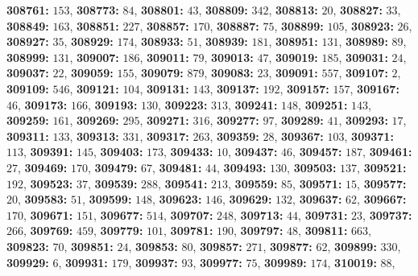 \textsf{\bfseries 308761:} $153$, \textsf{\bfseries 308773:} $84$, \textsf{\bfseries 308801:} $43$, \textsf{\bfseries 308809:} $342$, \textsf{\bfseries 308813:} $20$, \textsf{\bfseries 308827:} $33$, \textsf{\bfseries 308849:} $163$, \textsf{\bfseries 308851:} $227$, \textsf{\bfseries 308857:} $170$, \textsf{\bfseries 308887:} $75$, \textsf{\bfseries 308899:} $105$, \textsf{\bfseries 308923:} $26$, \textsf{\bfseries 308927:} $35$, \textsf{\bfseries 308929:} $174$, \textsf{\bfseries 308933:} $51$, \textsf{\bfseries 308939:} $181$, \textsf{\bfseries 308951:} $131$, \textsf{\bfseries 308989:} $89$, \textsf{\bfseries 308999:} $131$, \textsf{\bfseries 309007:} $186$, \textsf{\bfseries 309011:} $79$, \textsf{\bfseries 309013:} $47$, \textsf{\bfseries 309019:} $185$, \textsf{\bfseries 309031:} $24$, \textsf{\bfseries 309037:} $22$, \textsf{\bfseries 309059:} $155$, \textsf{\bfseries 309079:} $879$, \textsf{\bfseries 309083:} $23$, \textsf{\bfseries 309091:} $557$, \textsf{\bfseries 309107:} $2$, \textsf{\bfseries 309109:} $546$, \textsf{\bfseries 309121:} $104$, \textsf{\bfseries 309131:} $143$, \textsf{\bfseries 309137:} $192$, \textsf{\bfseries 309157:} $157$, \textsf{\bfseries 309167:} $46$, \textsf{\bfseries 309173:} $166$, \textsf{\bfseries 309193:} $130$, \textsf{\bfseries 309223:} $313$, \textsf{\bfseries 309241:} $148$, \textsf{\bfseries 309251:} $143$, \textsf{\bfseries 309259:} $161$, \textsf{\bfseries 309269:} $295$, \textsf{\bfseries 309271:} $316$, \textsf{\bfseries 309277:} $97$, \textsf{\bfseries 309289:} $41$, \textsf{\bfseries 309293:} $17$, \textsf{\bfseries 309311:} $133$, \textsf{\bfseries 309313:} $331$, \textsf{\bfseries 309317:} $263$, \textsf{\bfseries 309359:} $28$, \textsf{\bfseries 309367:} $103$, \textsf{\bfseries 309371:} $113$, \textsf{\bfseries 309391:} $145$, \textsf{\bfseries 309403:} $173$, \textsf{\bfseries 309433:} $10$, \textsf{\bfseries 309437:} $46$, \textsf{\bfseries 309457:} $187$, \textsf{\bfseries 309461:} $27$, \textsf{\bfseries 309469:} $170$, \textsf{\bfseries 309479:} $67$, \textsf{\bfseries 309481:} $44$, \textsf{\bfseries 309493:} $130$, \textsf{\bfseries 309503:} $137$, \textsf{\bfseries 309521:} $192$, \textsf{\bfseries 309523:} $37$, \textsf{\bfseries 309539:} $288$, \textsf{\bfseries 309541:} $213$, \textsf{\bfseries 309559:} $85$, \textsf{\bfseries 309571:} $15$, \textsf{\bfseries 309577:} $20$, \textsf{\bfseries 309583:} $51$, \textsf{\bfseries 309599:} $148$, \textsf{\bfseries 309623:} $146$, \textsf{\bfseries 309629:} $132$, \textsf{\bfseries 309637:} $62$, \textsf{\bfseries 309667:} $170$, \textsf{\bfseries 309671:} $151$, \textsf{\bfseries 309677:} $514$, \textsf{\bfseries 309707:} $248$, \textsf{\bfseries 309713:} $44$, \textsf{\bfseries 309731:} $23$, \textsf{\bfseries 309737:} $266$, \textsf{\bfseries 309769:} $459$, \textsf{\bfseries 309779:} $101$, \textsf{\bfseries 309781:} $190$, \textsf{\bfseries 309797:} $48$, \textsf{\bfseries 309811:} $663$, \textsf{\bfseries 309823:} $70$, \textsf{\bfseries 309851:} $24$, \textsf{\bfseries 309853:} $80$, \textsf{\bfseries 309857:} $271$, \textsf{\bfseries 309877:} $62$, \textsf{\bfseries 309899:} $330$, \textsf{\bfseries 309929:} $6$, \textsf{\bfseries 309931:} $179$, \textsf{\bfseries 309937:} $93$, \textsf{\bfseries 309977:} $75$, \textsf{\bfseries 309989:} $174$, \textsf{\bfseries 310019:} $88$, 
